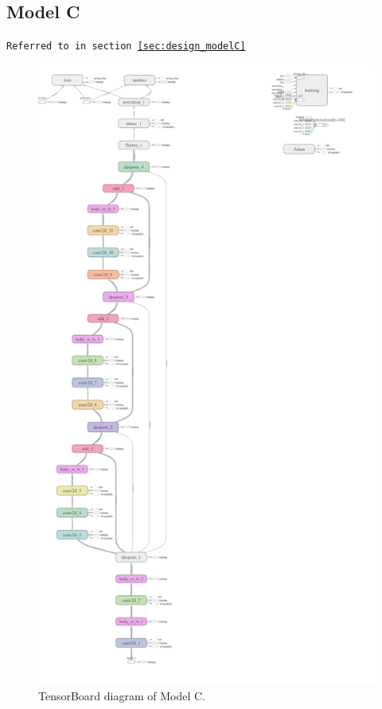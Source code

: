 \begin{appendices}
        \subsection{Model C}
        \label{app:modelC_diagram}
        \texttt{Referred to in section \ref{sec:design_modelC}}
        \begin{figure}[H]
            \centering
            \includegraphics[height=0.85\textheight]{figures/modelC_diagram.png}
            \caption*{TensorBoard diagram of Model C.}
        \end{figure}
    

\end{appendices}
